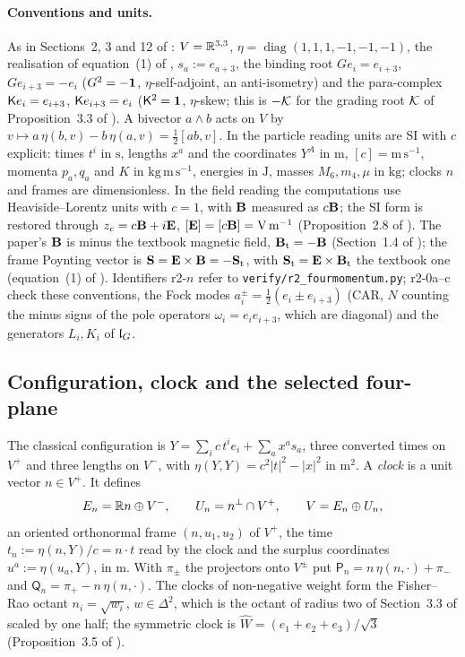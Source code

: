 \paragraph{Conventions and units.} As in Sections~2, 3 and 12 of \cite{ES17}: $V=\mathbb{R}^{3,3}$, $\eta=\operatorname{diag}(1,1,1,\allowbreak-1,-1,-1)$, the
realisation of equation~(1) of \cite{ES17}, $s_a:=e_{a+3}$, the binding root $Ge_i=e_{i+3}$, $Ge_{i+3}=-e_i$ ($G^2=-\mathbf 1$, $\eta$-self-adjoint, an
anti-isometry) and the para-complex $\mathsf K e_i=e_{i+3}$, $\mathsf K e_{i+3}=e_i$ ($\mathsf K^2=\mathbf 1$, $\eta$-skew; this is $-\mathcal K$ for the grading root $\mathcal K$ of
Proposition~3.3 of \cite{ES17}). A bivector $a\wedge b$ acts on $V$ by
$v\mapsto a\,\eta(b,v)-b\,\eta(a,v)=\tfrac12[ab,v]$. In the particle reading units are SI with $c$ explicit: times $t^i$ in $\mathrm s$, lengths $x^a$
and the coordinates $Y^A$ in $\mathrm m$, $[c]=\mathrm{m\,s^{-1}}$, momenta $p_a,q_a$ and $K$ in $\mathrm{kg\,m\,s^{-1}}$, energies in $\mathrm J$,
masses $M_6,m_4,\mu$ in $\mathrm{kg}$; clocks $n$ and frames are dimensionless. In the field reading the computations use Heaviside--Lorentz units with
$c=1$, with $\mathbf B$ measured as $c\mathbf B$; the SI form is restored through $z_c=c\mathbf B+i\mathbf E$, $[\mathbf E]=[c\mathbf B]=\mathrm{V\,m^{-1}}$ (Proposition~2.8 of \cite{RE}).
The paper's $\mathbf B$ is minus the textbook magnetic field, $\mathbf B_{\rm t}=-\mathbf B$ (Section~1.4 of \cite{ES17}); the frame Poynting vector is $\mathbf S=\mathbf E\times\mathbf B
=-\mathbf S_{\rm t}$, with $\mathbf S_{\rm t}=\mathbf E\times\mathbf B_{\rm t}$ the textbook one (equation~(1) of \cite{RE}). Identifiers r2-$n$ refer to
\texttt{verify/r2\_fourmomentum.py}; r2-0a--c check these conventions, the Fock modes $a^\pm_i=\tfrac12(e_i\pm e_{i+3})$ (CAR, $N$ counting the minus
signs of the pole operators $\omega_i=e_ie_{i+3}$, which are diagonal) and the generators $L_i,K_i$ of $\mathfrak l_G$.

\subsection{Configuration, clock and the selected four-plane}
\label{r2:sec:clock}

\begin{definition}
\label{r2:def:config}
The classical configuration is $Y=\sum_ic\,t^ie_i+\sum_ax^as_a$, three converted times on $V^+$ and three lengths on $V^-$, with
$\eta(Y,Y)=c^2|t|^2-|x|^2$ in $\mathrm m^2$. A \emph{clock} is a unit vector $n\in V^+$. It defines
\[
E_n=\mathbb{R} n\oplus V^-,\qquad U_n=n^\perp\cap V^+,\qquad V=E_n\oplus U_n ,
\]
an oriented orthonormal frame $(n,u_1,u_2)$ of $V^+$, the time $t_n:=\eta(n,Y)/c=n\cdot t$ read by the clock and the surplus coordinates
$u^a:=\eta(u_a,Y)$, in $\mathrm m$. With $\pi_\pm$ the projectors onto $V^\pm$ put $\mathsf P_n=n\,\eta(n,\cdot)+\pi_-$ and $\mathsf Q_n=\pi_+-n\,\eta(n,\cdot)$.
The clocks of non-negative weight form the Fisher--Rao octant $n_i=\sqrt{w_i}$, $w\in\Delta^2$, which is the octant of radius two of Section~3.3 of
\cite{ES17} scaled by one half; the symmetric clock is $\widehat W=(e_1+e_2+e_3)/\sqrt3$ (Proposition~3.5 of \cite{ES17}).
\end{definition}

